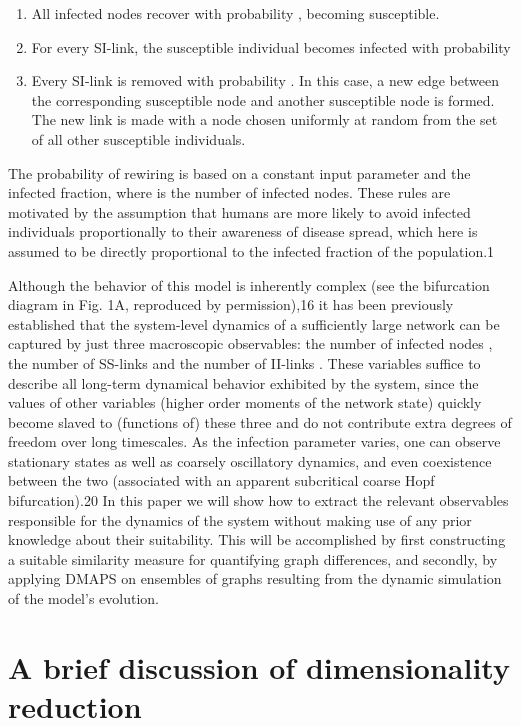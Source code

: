 \begin{enumerate}
  \item All infected nodes recover with
    probability , becoming susceptible.
  \item For every SI-link, the
    susceptible individual becomes infected with probability
  \item Every SI-link is removed with probability . In this case, a
    new edge between the corresponding susceptible node and another
    susceptible node is formed. The new link is made with a node
    chosen uniformly at random from the set of all other susceptible
    individuals.
\end{enumerate}

The probability of rewiring is based on a constant input parameter and
the infected fraction, where is the number of infected nodes. These
rules are motivated by the assumption that humans are more likely to
avoid infected individuals proportionally to their awareness of
disease spread, which here is assumed to be directly proportional to
the infected fraction of the population.1

Although the behavior of this model is inherently complex (see the
bifurcation diagram in Fig. 1A, reproduced by permission),16 it has
been previously established that the system-level dynamics of a
sufficiently large network can be captured by just three macroscopic
observables: the number of infected nodes , the number of SS-links and
the number of II-links . These variables suffice to describe all
long-term dynamical behavior exhibited by the system, since the values
of other variables (higher order moments of the network state) quickly
become slaved to (functions of) these three and do not contribute
extra degrees of freedom over long timescales. As the infection
parameter varies, one can observe stationary states as well as
coarsely oscillatory dynamics, and even coexistence between the two
(associated with an apparent subcritical coarse Hopf bifurcation).20
In this paper we will show how to extract the relevant observables
responsible for the dynamics of the system without making use of any
prior knowledge about their suitability. This will be accomplished by
first constructing a suitable similarity measure for quantifying graph
differences, and secondly, by applying DMAPS on ensembles of graphs
resulting from the dynamic simulation of the model’s evolution.

\section{A brief discussion of dimensionality reduction}

